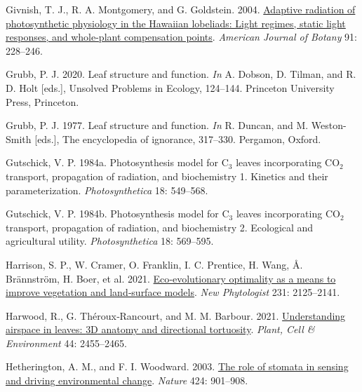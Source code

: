 \documentclass[
  letterpaper,
  DIV=11,
  numbers=noendperiod]{scrartcl}
\newlength{\cslhangindent}
\newlength{\cslentryspacingunit} %
\newenvironment{CSLReferences}[2] %
 {%
  \setlength{\parindent}{0pt}
  \ifodd #1
  \let\oldpar\par
  \def\par{\hangindent=\cslhangindent\oldpar}
  \fi
  \setlength{\parskip}{#2\cslentryspacingunit}
 }%
 {}
\begin{document}
\begin{CSLReferences}{1}{0}
\leavevmode{}%
Givnish, T. J., R. A. Montgomery, and G. Goldstein. 2004.
\href{https://doi.org/10.3732/ajb.91.2.228}{Adaptive radiation of
photosynthetic physiology in the {Hawaiian} lobeliads: Light regimes,
static light responses, and whole-plant compensation points}.
\emph{American Journal of Botany} 91: 228--246.

\leavevmode{}%
Grubb, P. J. 2020. Leaf structure and function. \emph{In} A. Dobson, D.
Tilman, and R. D. Holt {[}eds.{]}, Unsolved {Problems} in {Ecology},
124--144. Princeton University Press, Princeton.

\leavevmode{}%
Grubb, P. J. 1977. Leaf structure and function. \emph{In} R. Duncan, and
M. Weston-Smith {[}eds.{]}, The encyclopedia of ignorance, 317--330.
Pergamon, Oxford.

\leavevmode{}%
Gutschick, V. P. 1984a. Photosynthesis model for {C}\(_{\textrm{3}}\)
leaves incorporating {CO}\(_{\textrm{2}}\) transport, propagation of
radiation, and biochemistry 1. Kinetics and their parameterization.
\emph{Photosynthetica} 18: 549--568.

\leavevmode{}%
Gutschick, V. P. 1984b. Photosynthesis model for {C}\(_{\textrm{3}}\)
leaves incorporating {CO}\(_{\textrm{2}}\) transport, propagation of
radiation, and biochemistry 2. Ecological and agricultural utility.
\emph{Photosynthetica} 18: 569--595.

\leavevmode{}%
Harrison, S. P., W. Cramer, O. Franklin, I. C. Prentice, H. Wang, Å.
Brännström, H. Boer, et al. 2021.
\href{https://doi.org/10.1111/nph.17558}{Eco‐evolutionary optimality as
a means to improve vegetation and land‐surface models}. \emph{New
Phytologist} 231: 2125--2141.

\leavevmode{}%
Harwood, R., G. Théroux‐Rancourt, and M. M. Barbour. 2021.
\href{https://doi.org/10.1111/pce.14079}{Understanding airspace in
leaves: {3D} anatomy and directional tortuosity}. \emph{Plant, Cell \&
Environment} 44: 2455--2465.

\leavevmode{}%
Hetherington, A. M., and F. I. Woodward. 2003.
\href{https://doi.org/10.1038/nature01843}{The role of stomata in
sensing and driving environmental change}. \emph{Nature} 424: 901--908.


\end{CSLReferences}
\end{document}
